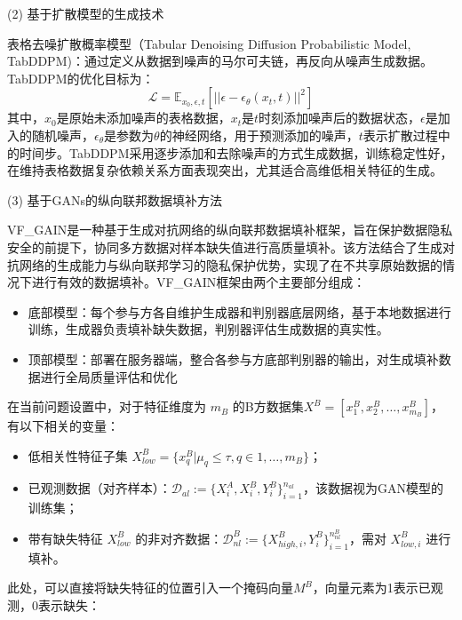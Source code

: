 (2) 基于扩散模型的生成技术

表格去噪扩散概率模型（Tabular Denoising Diffusion Probabilistic Model, TabDDPM)：通过定义从数据到噪声的马尔可夫链，再反向从噪声生成数据。TabDDPM的优化目标为：
\begin{equation}
	\mathcal{L} = \mathbb{E}_{x_0, \epsilon, t}[||\epsilon - \epsilon_\theta(x_t, t)||^2]
\end{equation}
其中，$x_0$是原始未添加噪声的表格数据，$x_t$是$t$时刻添加噪声后的数据状态，$\epsilon$是加入的随机噪声，$\epsilon_\theta$是参数为$\theta$的神经网络，用于预测添加的噪声，$t$表示扩散过程中的时间步。TabDDPM采用逐步添加和去除噪声的方式生成数据，训练稳定性好，在维持表格数据复杂依赖关系方面表现突出，尤其适合高维低相关特征的生成。

(3) 基于GANs的纵向联邦数据填补方法

VF\_GAIN是一种基于生成对抗网络的纵向联邦数据填补框架，旨在保护数据隐私安全的前提下，协同多方数据对样本缺失值进行高质量填补。该方法结合了生成对抗网络的生成能力与纵向联邦学习的隐私保护优势，实现了在不共享原始数据的情况下进行有效的数据填补。VF\_GAIN框架由两个主要部分组成：
\begin{itemize}[
	topsep=0pt,   %
	partopsep=0pt, %
	parsep=0pt,   %
	itemsep=0pt,   %
	]
	\item 底部模型：每个参与方各自维护生成器和判别器底层网络，基于本地数据进行训练，生成器负责填补缺失数据，判别器评估生成数据的真实性。
	\item 顶部模型：部署在服务器端，整合各参与方底部判别器的输出，对生成填补数据进行全局质量评估和优化
\end{itemize}

在当前问题设置中，对于特征维度为 $m_B$ 的B方数据集$X^B=[x_1^B, x_2^B,\dots,x_{m_B}^B]$，有以下相关的变量：

\begin{itemize}[
	topsep=0pt,   %
	partopsep=0pt, %
	parsep=0pt,   %
	itemsep=0pt,   %
	]
	\item 低相关性特征子集 $X^B_{low} = \{ x_q^B | \mu_q \leq \tau, q \in {1,\dots,m_B}\}$；
	\item 已观测数据（对齐样本）：$\mathcal{D}_{al} := \{X^A_{i}, X^B_{i}, Y^B_{i}\}_{i=1}^{n_{al}}$，该数据视为GAN模型的训练集；
	\item 带有缺失特征 $X^B_{low}$ 的非对齐数据：$\mathcal{D}_{nl}^B := \{X^B_{high, i}, Y^B_{i}\}_{i=1}^{n^B_{nl}}$，需对 $X^B_{low,i}$ 进行填补。
\end{itemize}
此处，可以直接将缺失特征的位置引入一个掩码向量$M^B$，向量元素为1表示已观测，0表示缺失：

